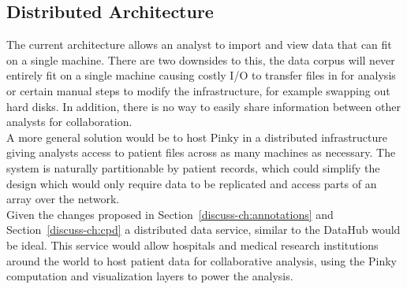 \subsection{Distributed Architecture}\label{discuss-ch:dist-arch}

The current architecture allows an analyst to import and view data that can fit
on a single machine. There are two downsides to this, the data corpus will
never entirely fit on a single machine causing costly I/O to transfer files in
for analysis or certain manual steps to modify the infrastructure, for example
swapping out hard disks. In addition, there is no way to easily share
information between other analysts for collaboration. \\

A more general solution would be to host Pinky in a distributed infrastructure
giving analysts access to patient files across as many machines as necessary.
The system is naturally partitionable by patient records, which could simplify
the design which would only require data to be replicated and access parts of
an array over the network. \\

Given the changes proposed in Section~\ref{discuss-ch:annotations} and
Section~\ref{discuss-ch:cpd} a distributed data service, similar to the
DataHub\cite{datahub} would be ideal.  This service would allow hospitals and
medical research institutions around the world to host patient data for
collaborative analysis, using the Pinky computation and visualization layers to
power the analysis.

